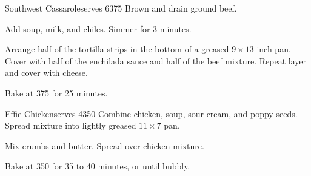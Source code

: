 
\begin{recipe}{Southwest Cassarole}{serves 6}{375\0}
    Brown and drain ground beef.

    Add soup, milk, and chiles. Simmer for 3 minutes.

    Arrange half of the tortilla strips in the bottom of a greased $9 \times 13$ inch pan. Cover with half of the enchilada sauce and half of the beef mixture. Repeat layer and cover with cheese.

    \newstep
    Bake at 375\0 for 25 minutes.

\end{recipe}

\begin{recipe}{Effie Chicken}{serves 4}{350\0}
    Combine chicken, soup, sour cream, and poppy seeds. Spread mixture into lightly greased $11\times7$ pan.

    Mix crumbs and butter. Spread over chicken mixture.

    \newstep
    Bake at 350\0 for 35 to 40 minutes, or until bubbly.
\end{recipe}
